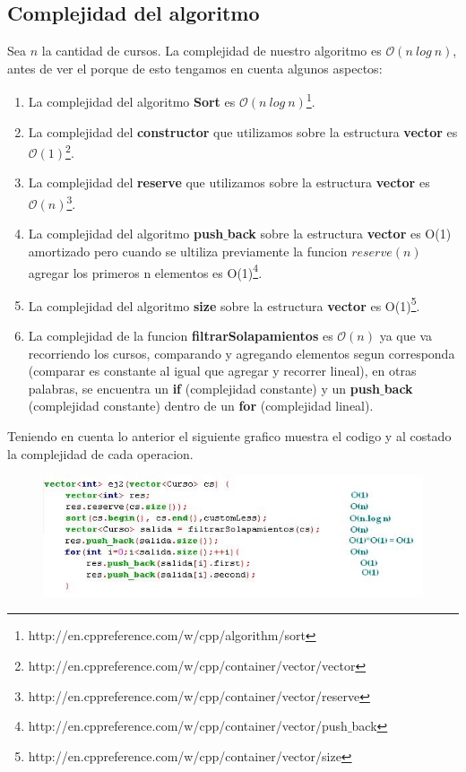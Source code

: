 \subsection{Complejidad del algoritmo}

Sea $n$ la cantidad de cursos. La complejidad de nuestro algoritmo es $\mathcal{O}(n\ log\ n)$, antes de ver el porque de esto tengamos en cuenta algunos aspectos:
\begin{enumerate}
\item La complejidad del algoritmo \textbf{Sort} es $\mathcal{O}(n\ log\ n)$\footnote{http://en.cppreference.com/w/cpp/algorithm/sort}.
\item La complejidad del \textbf{constructor} que utilizamos sobre la estructura \textbf{vector} es $\mathcal{O}(1)$\footnote{http://en.cppreference.com/w/cpp/container/vector/vector}.
\item La complejidad del \textbf{reserve} que utilizamos sobre la estructura \textbf{vector} es $\mathcal{O}(n)$\footnote{http://en.cppreference.com/w/cpp/container/vector/reserve}.
\item La complejidad del algoritmo \textbf{push$\_$back} sobre la estructura \textbf{vector} es O(1) amortizado pero cuando se ultiliza previamente la funcion $reserve(n)$ agregar los primeros n elementos es O(1)\footnote{http://en.cppreference.com/w/cpp/container/vector/push$\_$back}. 
\item La complejidad del algoritmo \textbf{size} sobre la estructura \textbf{vector} es O(1)\footnote{http://en.cppreference.com/w/cpp/container/vector/size}.
\item La complejidad de la funcion \textbf{filtrarSolapamientos} es $\mathcal{O}(n)$ ya que va recorriendo los cursos, comparando y agregando elementos segun corresponda (comparar es constante al igual que agregar y recorrer lineal), en otras palabras, se encuentra un \textbf{if} (complejidad constante) y un \textbf{push$\_$back} (complejidad constante) dentro de un \textbf{for} (complejidad lineal). 
\end{enumerate}
Teniendo en cuenta lo anterior el siguiente grafico muestra el codigo y al costado la complejidad de cada operacion.

\begin{figure}[H] %
\begin{center}
\includegraphics[]{../imgs/comple2.jpg}
\end{center}
\end{figure}

